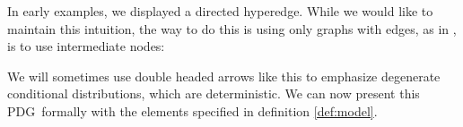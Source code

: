 \documentclass{article}
\newcommand{\MN}{PDG}
\numberwithin{equation}{section}
\begin{document}
	\begin{example}[continues=ex:planet]
		In early examples, we displayed a directed hyperedge. While we would like to maintain this intuition, the way to do this is using only graphs with edges, as in , is to use intermediate nodes:
		
		\begin{center}
		\end{center}
		We will sometimes use double headed arrows like this to emphasize degenerate conditional distributions, which are deterministic.
		We can now present this \MN\ formally with the elements specified in definition \ref{def:model}.
		

\end{example}
\end{document}
